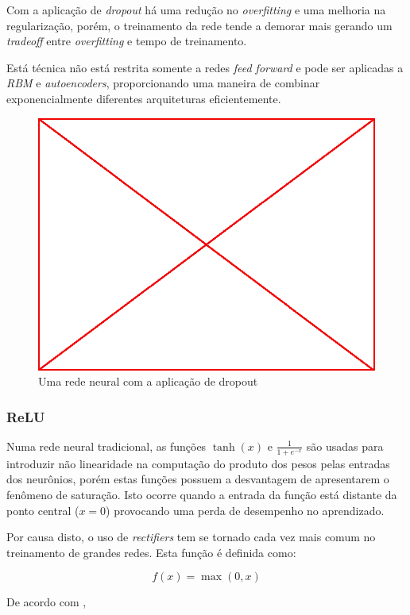 Com a aplicação de \emph{dropout} há uma redução no \emph{overfitting} e uma
melhoria na regularização, porém, o treinamento da rede tende a demorar mais
gerando um \emph{tradeoff} entre \emph{overfitting} e tempo de
treinamento.\cite{srivastava2014dropout}

Está técnica não está restrita somente a redes \emph{feed forward} e pode ser
aplicadas a \emph{RBM} e \emph{autoencoders}, proporcionando uma maneira de
combinar exponencialmente diferentes arquiteturas
eficientemente.\cite{srivastava2014dropout}

\begin{figure}
  \caption{Uma rede neural com a aplicação de dropout}
  \begin{center}
    \includegraphics[scale=0.5]{placeholder}
  \end{center}
\end{figure}


\subsubsection{ReLU}

Numa rede neural tradicional, as funções $\tanh(x)$ e $\frac{1}{1+e^{-x}}$ são
usadas para introduzir não linearidade na computação do produto dos pesos pelas
entradas dos neurônios, porém estas funções possuem a desvantagem de
apresentarem o fenômeno de saturação. Isto ocorre quando a entrada da função
está distante da ponto central ($x=0$) provocando uma perda de desempenho no
aprendizado.\cite{krizhevsky2012imagenet}

Por causa disto, o uso de \emph{rectifiers} tem se tornado cada vez mais comum
no treinamento de grandes redes. Esta função é definida como:

$$ f(x) = \max(0,x) $$

De acordo com \citeauthor{krizhevsky2012imagenet},
